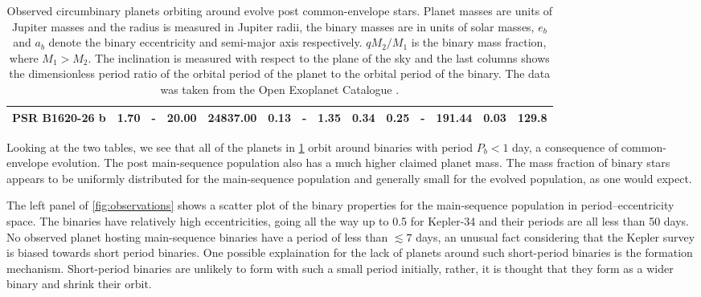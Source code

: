 \documentclass[twoside,openright,titlepage,numbers=noenddot,headinclude,%
                footinclude=true,cleardoublepage=empty,abstractoff, 
                BCOR=5mm,paper=a4,fontsize=11pt,%
                american,%
                ]{scrreprt}%
\begin{document}
\begin{table}
\begin{tabular}{lccccccccccccc}
    PSR B1620-26 b     &   1.70 & - &  20.00 &  24837.00 &  0.13 &   - &    1.35 &    0.34 &  0.25 &       - &    191.44 &      0.03 & 129.8\\
\bottomrule
\end{tabular}\caption[Observed circumbinary planets orbiting post common envelope stars.]{Observed circumbinary 
    planets orbiting around evolve post 
common-envelope 
    stars. Planet masses are units of Jupiter masses and the radius is measured
    in Jupiter radii, the binary masses are in units of solar masses, $e_b$ and
    $a_b$ denote the binary eccentricity and semi-major axis respectively. $qM_2/M_1$ is the 
    binary mass fraction, where $M_1>M_2$. The inclination is measured with
    respect to the plane of the sky and the last columns shows the dimensionless 
    period ratio of the orbital period of the planet to the orbital period of the
    binary. The data was taken from the Open Exoplanet Catalogue \citep{catalogue}.}
\label{table:timing_planets}
\end{table}

Looking at the two tables, we see that all of the planets
in \cref{table:timing_planets} orbit around binaries with period $P_b<1$ day, a 
consequence of common-envelope evolution.
The post main-sequence population also has a much higher claimed planet mass. 
The mass fraction of binary stars appears to be uniformly distributed for 
the main-sequence population and generally small for the evolved population,
as one would expect.

The left panel of \cref{fig:observations} shows a scatter plot of the 
binary properties for the main-sequence population in 
period--eccentricity space. The binaries have relatively high eccentricities,
going all the way up to 0.5 for Kepler-34 and their periods 
are all less than 50 days. No observed 
planet hosting main-sequence 
binaries have a period of less than $\lesssim 7$ days, an unusual fact
considering that the Kepler survey is biased towards short period binaries.
One possible explaination for the lack of planets around such short-period
binaries is the formation mechanism. Short-period binaries are unlikely
to form with such a small period initially, rather, it is thought that 
they form as a wider binary and shrink their orbit.
\end{document}
